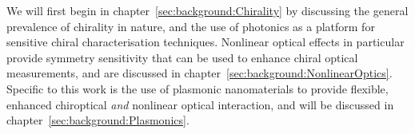 We will first begin in chapter~\ref{sec:background:Chirality} by discussing the general prevalence of chirality in nature, and the use of photonics as a platform for sensitive chiral characterisation techniques. Nonlinear optical effects in particular provide symmetry sensitivity that can be used to enhance chiral optical measurements, and are discussed in chapter~\ref{sec:background:NonlinearOptics}. Specific to this work is the use of plasmonic nanomaterials to provide flexible, enhanced chiroptical \textit{and} nonlinear optical interaction, and will be discussed in chapter~\ref{sec:background:Plasmonics}. 



